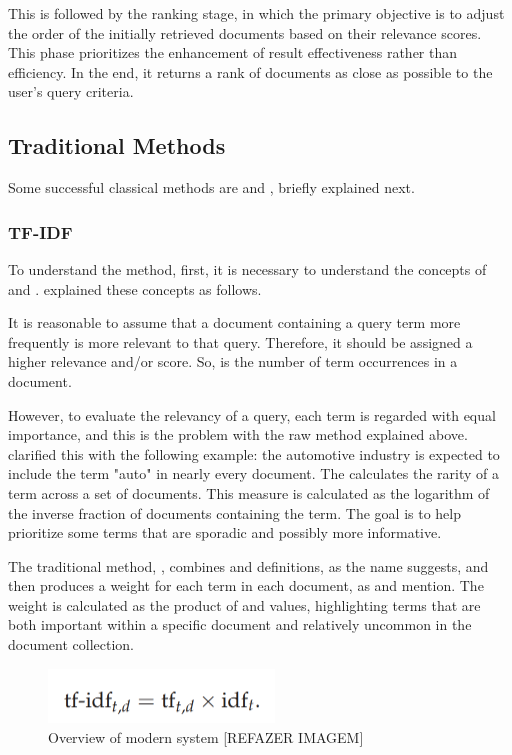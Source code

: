 This is followed by the ranking stage, in which the primary objective is to adjust the order of the initially retrieved documents based on their relevance scores. This phase prioritizes the enhancement of result effectiveness rather than efficiency. In the end, it returns a rank of documents as close as possible to the user's query criteria.


\subsection{Traditional Methods}

Some successful classical methods are {\tfidf} and {\bm}, briefly explained next.

\subsubsection{TF-IDF}

To understand the {\tfidf} method, first, it is necessary to understand the concepts of {\tf} and {\idf}. \citet{manning_introduction_2009} explained these concepts as follows.

It is reasonable to assume that a document containing a query term more frequently is more relevant to that query. Therefore, it should be assigned a higher relevance and/or score. So, {\tf} is the number of term occurrences in a document.

However, to evaluate the relevancy of a query, each term is regarded with equal importance, and this is the problem with the raw method explained above. \citet{manning_introduction_2009} clarified this with the following example: the automotive industry is expected to include the term "auto" in nearly every document. The  {\idf} calculates the rarity of a term across a set of documents. This measure is calculated as the logarithm of the inverse fraction of documents containing the term. The goal is to help prioritize some terms that are sporadic and possibly more informative.

The traditional {\ir} method, {\tfidf}, combines  {\tf} and  {\idf} definitions, as the name suggests, and then produces a weight for each term in each document, as \citet{manning_introduction_2009} and \citet{chizhik_challenges_2020} mention. The weight is calculated as the product of  {\tf} and  {\idf} values, highlighting terms that are both important within a specific document and relatively uncommon in the document collection. 

\begin{figure}[ht]
    \includegraphics[width=6cm]{figs/chapter2/tf-idf_formula.png}
    \centering
    \caption{Overview of modern {\ir} system [REFAZER IMAGEM]}
\end{figure}


